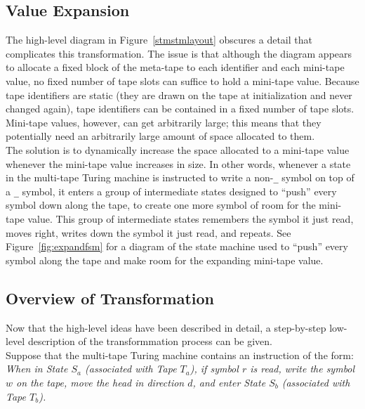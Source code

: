 \documentclass[11pt]{report}
\begin{document}
\subsection{Value Expansion}

The high-level diagram in Figure~\ref{stmstmlayout} obscures a detail that complicates this transformation. The issue is that although the diagram appears to allocate a fixed block of the meta-tape to each identifier and each mini-tape value, no fixed number of tape slots can suffice to hold a mini-tape value. Because tape identifiers are static (they are drawn on the tape at initialization and never changed again), tape identifiers can be contained in a fixed number of tape slots. Mini-tape values, however, can get arbitrarily large; this means that they potentially need an arbitrarily large amount of space allocated to them. \\

The solution is to dynamically increase the space allocated to a mini-tape value whenever the mini-tape value increases in size. In other words, whenever a state in the multi-tape Turing machine is instructed to write a non-\texttt{\_} symbol on top of a \texttt{\_} symbol, it enters a group of intermediate states designed to ``push'' every symbol down along the tape, to create one more symbol of room for the mini-tape value. This group of intermediate states remembers the symbol it just read, moves right, writes down the symbol it just read, and repeats. See Figure~\ref{fig:expandfsm} for a diagram of the state machine used to ``push'' every symbol along the tape and make room for the expanding mini-tape value. \\

\subsection{Overview of Transformation \label{mttoststeps}}

Now that the high-level ideas have been described in detail, a step-by-step low-level description of the transformmation process can be given. \\

Suppose that the multi-tape Turing machine contains an instruction of the form: \\

\emph{When in State $S_a$ (associated with Tape $T_a$), if symbol $r$ is read, write the symbol $w$ on the tape, move the head in direction $d$, and enter State $S_b$ (associated with Tape $T_b$).} \\
\end{document}
